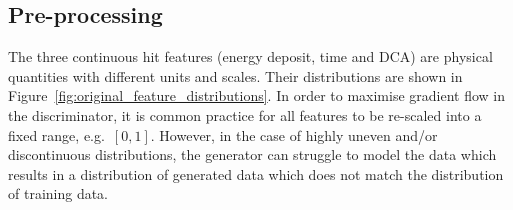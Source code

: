 


\subsection{Pre-processing}
The three continuous hit features (energy deposit, time and DCA) are physical
quantities with different units and scales. Their distributions are shown in
Figure~\ref{fig:original_feature_distributions}. In order to maximise gradient
flow in the discriminator, it is common practice for all features to be
re-scaled into a fixed range, e.g.\ $[0, 1]$. However, in the case of highly
uneven and/or discontinuous distributions, the generator can struggle to model
the data which results in a distribution of generated data which does not match
the distribution of training data.

